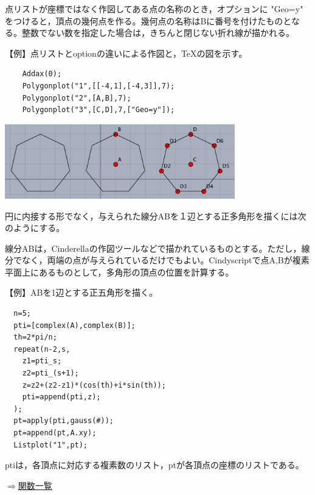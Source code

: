 \documentclass[papersize,a4paper,12pt,uplatex]{jsarticle}
\begin{document}
\begin{description}
点リストが座標ではなく作図してある点の名称のとき，オプションに  "Geo=y" をつけると，頂点の幾何点を作る。幾何点の名称はBに番号を付けたものとなる。整数でない数を指定した場合は，きちんと閉じない折れ線が描かれる。

\vspace{\baselineskip}
【例】点リストとoptionの違いによる作図と，TeXの図を示す。

\begin{verbatim}
    Addax(0);
    Polygonplot("1",[[-4,1],[-4,3]],7);
    Polygonplot("2",[A,B],7);
    Polygonplot("3",[C,D],7,["Geo=y"]);
\end{verbatim}

\hspace{10mm}\includegraphics[bb=0.00 0.00 541.03 175.01,width=10cm]{Fig/polygonplot2.pdf}

\hspace{10mm}


円に内接する形でなく，与えられた線分ABを１辺とする正多角形を描くには次のようにする。

線分ABは，Cinderellaの作図ツールなどで描かれているものとする。ただし，線分でなく，両端の点が与えられているだけでもよい。Cindyscriptで点A,Bが複素平面上にあるものとして，多角形の頂点の位置を計算する。

\vspace{\baselineskip}
【例】ABを1辺とする正五角形を描く。

\begin{verbatim}
  n=5;
  pti=[complex(A),complex(B)];
  th=2*pi/n;
  repeat(n-2,s,
    z1=pti_s;
    z2=pti_(s+1);
    z=z2+(z2-z1)*(cos(th)+i*sin(th));
    pti=append(pti,z);
  );
  pt=apply(pti,gauss(#));
  pt=append(pt,A.xy);
  Listplot("1",pt);
\end{verbatim}
ptiは，各頂点に対応する複素数のリスト，ptが各頂点の座標のリストである。 

\begin{flushright}  \hyperlink{functionlist}{$\Rightarrow$関数一覧}\end{flushright}

\end{description}
\newpage
\end{document}
